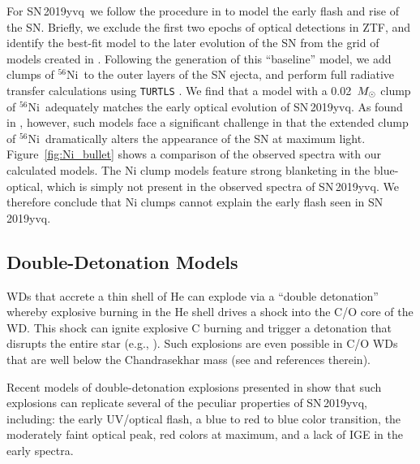 \documentclass[twocolumn]{aastex63}
\newcommand{\radni}{$^{56}$Ni}
\newcommand{\sn}{SN\,2019yvq}
\begin{document}
For \sn\ we follow the procedure in \citet{Magee20a} to model the early flash
and rise of the SN. Briefly, we exclude the first two epochs of optical
detections in ZTF, and identify the best-fit model to the later evolution of
the SN from the grid of models created in \citet{Magee20}. Following the
generation of this ``baseline'' model, we add clumps of \radni\ to the outer
layers of the SN ejecta, and perform full radiative transfer calculations
using \texttt{TURTLS} \citep{Magee18}. We find that a model with a
0.02~$M_{\rm{\odot}}$ clump of \radni\ adequately matches the early optical
evolution of \sn. As found in \citet{Magee20a}, however, such models face a
significant challenge in that the extended clump of \radni\ dramatically
alters the appearance of the SN at maximum light. Figure~\ref{fig:Ni_bullet}
shows a comparison of the observed spectra with our calculated models. The Ni
clump models feature strong blanketing in the blue-optical, which is simply
not present in the observed spectra of \sn. We therefore conclude that Ni
clumps cannot explain the early flash seen in \sn.

\subsection{Double-Detonation Models}

WDs that accrete a thin shell of He can explode via a ``double detonation''
whereby explosive burning in the He shell drives a shock into the C/O core of
the WD. This shock can ignite explosive C burning and trigger a detonation
that disrupts the entire star (e.g., \citealt{Nomoto82,Nomoto82a,Woosley94}).
Such explosions are even possible in C/O WDs that are well below the
Chandrasekhar mass (see \citealt{Fink07, Fink10} and references therein).

Recent models of double-detonation explosions presented in \citet{Polin19}
show that such explosions can replicate several of the peculiar properties of
\sn, including: the early UV/optical flash, a blue to red to blue color
transition, the moderately faint optical peak, red colors at maximum, and a
lack of IGE in the early spectra.
\end{document}
